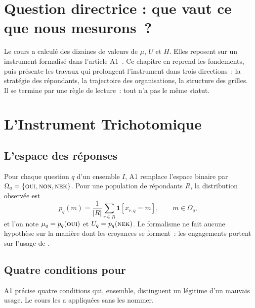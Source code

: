 \bigskip

\section*{Question directrice : que vaut ce que nous mesurons~?}

Le cours a calculé des dizaines de valeurs de $\mu$, $U$ et $H$. Elles
reposent sur un instrument formalisé dans l'article A1~\cite{minka2026nek}.
Ce chapitre en reprend les fondements, puis présente les travaux qui
prolongent l'instrument dans trois directions~: la stratégie des
répondants, la trajectoire des organisations, la structure des grilles.
Il se termine par une règle de lecture~: tout n'a pas le même statut.

\separateur

\section{L'Instrument Trichotomique}
\label{sec:c22-instrument}

\subsection{L'espace des réponses}

Pour chaque question $q$ d'un ensemble $I$, A1 remplace l'espace binaire
par $\Omega_q = \{\textsc{oui}{}, \textsc{non}{}, \textsc{nek}{}\}$. Pour une population de
répondants $R$, la distribution observée est
\[
    p_q(m) = \frac{1}{|R|} \sum_{r \in R} \mathbf{1}[x_{r,q} = m],
    \qquad m \in \Omega_q,
\]
et l'on note $\mu_q = p_q(\textsc{oui}{})$ et $U_q = p_q(\textsc{nek}{})$. Le formalisme ne
fait aucune hypothèse sur la manière dont les croyances se forment~: les
engagements portent sur l'usage de \NEK{}.

\subsection{Quatre conditions pour \NEK{}}

A1 précise quatre conditions qui, ensemble, distinguent un \NEK{} légitime
d'un mauvais usage. Le cours les a appliquées sans les nommer.

